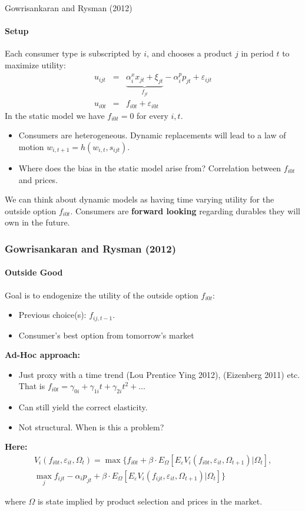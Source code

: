 \documentclass[11pt,aspectratio=169]{beamer}
\begin{document}
\begin{frame}{Gowrisankaran and Rysman (2012)}
\framesubtitle{Setup}
\small
Each consumer type is subscripted by $i$, and chooses a product $j$ in period $t$ to maximize utility:
\begin{eqnarray*}
u_{ijt} &=&   \underbrace{\alpha_i^x x_{jt} +  \xi_{jt}}_{f_{jt}} - \alpha_{i}^p p_{jt} + \varepsilon_{ijt} \\
 u_{i0t} &=&  f_{i0t} + \varepsilon_{i0t} 
\end{eqnarray*}
In the static model we have $f_{i0t} = 0$ for every $i,t$.\\
\begin{itemize}\footnotesize
\item[$-$] Consumers are heterogeneous. Dynamic replacements will lead to a law of motion $w_{i,t+1} =h(w_{i,t},s_{ijt})$.
\item[$-$] Where does the bias in the static model arise from? Correlation between $f_{i0t}$ and prices.
\end{itemize}
\vspace{0.2cm}
We can think about dynamic models as having time varying utility for the outside option $f_{i0t}$. Consumers are \textbf{forward looking} regarding durables they will own in the future.

\end{frame}

\begin{frame}
\frametitle{Gowrisankaran and Rysman (2012)}
\framesubtitle{Outside Good}\small
Goal is to endogenize the utility of the outside option $f_{i0t}$:
\begin{itemize}\footnotesize
\item[$-$] Previous choice(s): $f_{ij,t-1}$.
\item[$-$] Consumer's best option from tomorrow's market
\end{itemize}
\vspace{-0.1cm}
\textbf{Ad-Hoc approach:}
\begin{itemize}\footnotesize
\item[$-$]  Just proxy with a time trend (Lou Prentice Ying 2012), (Eizenberg 2011) etc.  That is $f_{i0t} = \gamma_{0i} + \gamma_{1i} t + \gamma_{2i} t^2 + \ldots$
\item[$-$] Can still yield the correct elasticity.
\item[$-$] Not structural. When is this a problem?
\end{itemize}

\textbf{Here:}
\vspace{-0.4cm}
\begin{multline*}
V_i(f_{i0t},\varepsilon_{i t}, \Omega_t) = \max \{ f_{i0t} + \beta\cdot E_{\Omega}[ E_{\varepsilon} V_i (f_{i0t}, \varepsilon_{it}, \Omega_{t+1}) |\Omega_{t} ] ,\\
\max_j f_{ijt}  -\alpha_i p_{jt} + \beta\cdot E_{\Omega}[ E_{\varepsilon} V_i (f_{ijt}, \varepsilon_{it}, \Omega_{t+1}) |\Omega_{t} ]  \}
\end{multline*}

where $\Omega$ is state implied by product selection and prices in the market.

\end{frame}
\end{document}
